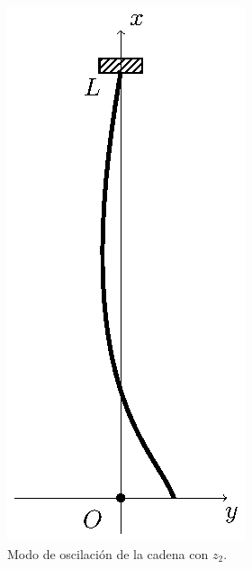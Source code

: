 \begin{figure}[H]
    \centering
    \includegraphics[scale=1.5]{Imagenes/Cadena_Oscilante_04.eps}
    \caption{Modo de oscilación de la cadena con $z_{2}$.}
\end{figure}
